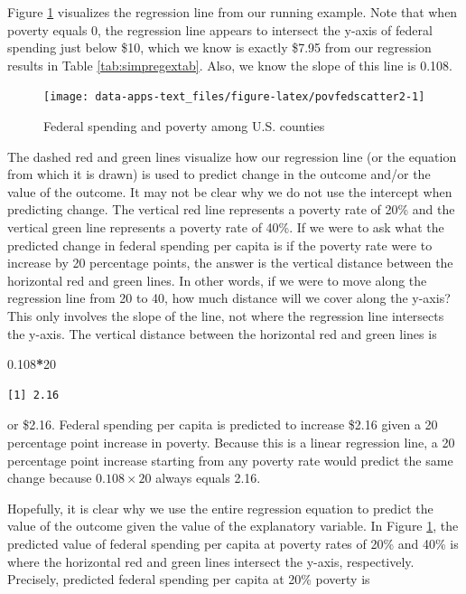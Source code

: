 \documentclass[
]{book}
\makeatletter
\newenvironment{Shaded}{\begin{snugshade}}{\end{snugshade}}
\newcommand{\DecValTok}[1]{\textcolor[rgb]{0.06,0.06,0.06}{#1}}
\newcommand{\FloatTok}[1]{\textcolor[rgb]{0.06,0.06,0.06}{#1}}
\newcommand{\SpecialCharTok}[1]{\textcolor[rgb]{0.43,0.43,0.43}{\textbf{#1}}}
\newenvironment{kframe}{%
\medskip{}
\setlength{\fboxsep}{.8em}
 \def\at@end@of@kframe{}%
 \ifinner\ifhmode%
  \def\at@end@of@kframe{\end{minipage}}%
  \begin{minipage}{\columnwidth}%
 \fi\fi%
 \def\FrameCommand##1{\hskip\@totalleftmargin \hskip-\fboxsep
 \colorbox{shadecolor}{##1}\hskip-\fboxsep
     \hskip-\linewidth \hskip-\@totalleftmargin \hskip\columnwidth}%
 \MakeFramed {\advance\hsize-\width
   \@totalleftmargin\z@ \linewidth\hsize
   \@setminipage}}%
 {\par\unskip\endMakeFramed%
 \at@end@of@kframe}
\renewenvironment{Shaded}{\begin{kframe}}{\end{kframe}}
\makeatother
\begin{document}
Figure \ref{fig:povfedscatter2} visualizes the regression line from our running example. Note that when poverty equals 0, the regression line appears to intersect the y-axis of federal spending just below \$10, which we know is exactly \$7.95 from our regression results in Table \ref{tab:simpregextab}. Also, we know the slope of this line is 0.108.

\begin{figure}

{\centering \texttt{[image: data-apps-text\_files/figure-latex/povfedscatter2-1]} 

}

\caption{Federal spending and poverty among U.S. counties}\label{fig:povfedscatter2}
\end{figure}

The dashed red and green lines visualize how our regression line (or the equation from which it is drawn) is used to predict change in the outcome and/or the value of the outcome. It may not be clear why we do not use the intercept when predicting change. The vertical red line represents a poverty rate of 20\% and the vertical green line represents a poverty rate of 40\%. If we were to ask what the predicted change in federal spending per capita is if the poverty rate were to increase by 20 percentage points, the answer is the vertical distance between the horizontal red and green lines. In other words, if we were to move along the regression line from 20 to 40, how much distance will we cover along the y-axis? This only involves the slope of the line, not where the regression line intersects the y-axis. The vertical distance between the horizontal red and green lines is

\begin{Shaded}
\begin{Highlighting}[]
\FloatTok{0.108}\SpecialCharTok{*}\DecValTok{20}
\end{Highlighting}
\end{Shaded}

\begin{verbatim}
[1] 2.16
\end{verbatim}

or \$2.16. Federal spending per capita is predicted to increase \$2.16 given a 20 percentage point increase in poverty. Because this is a linear regression line, a 20 percentage point increase starting from any poverty rate would predict the same change because \(0.108 \times 20\) always equals 2.16.

Hopefully, it is clear why we use the entire regression equation to predict the value of the outcome given the value of the explanatory variable. In Figure \ref{fig:povfedscatter2}, the predicted value of federal spending per capita at poverty rates of 20\% and 40\% is where the horizontal red and green lines intersect the y-axis, respectively. Precisely, predicted federal spending per capita at 20\% poverty is
\end{document}
